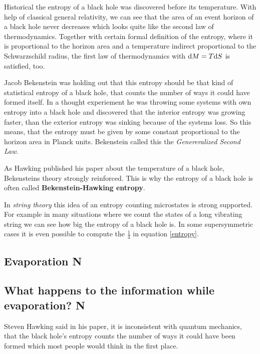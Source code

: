 	Historical the entropy of a black hole was discovered before its temperature. With help of classical general relativity, we can see that the area of an event horizon of a black hole never decreases which looks quite like the second law of thermodynamics. Together with certain formal definition of the entropy, where it is proportional to the horizon area and a temperature indirect proportional to the Schwarzschild radius, the first law of thermodynamics with $\mathrm{d} M = T \mathrm{d} S$ is satisfied, too. 
	
	Jacob Bekenstein was holding out that this entropy should be that kind of statistical entropy of a black hole, that counts the number of ways it could have formed itself. 
	In a thought experiement he was throwing some systems with own entropy into a black hole and discovered that the interior entropy was growing faster, than the exterior entropy was sinking because of the systems loss. 
	So this means, that the entropy must be given by some constant proportional to the horizon area in Planck units.
	Bekenstein called this the \textit{Genereralized Second Law}.
	
	As Hawking published his paper about the temperature of a black hole, Bekensteins theory strongly reinforced. This is why the entropy of a black hole is often called \textbf{Bekenstein-Hawking entropy}. 
	
	In \textit{string theory} this idea of an entropy counting microstates is strong supported. For example in many situations where we count the states of a long vibrating string we can see how big the entropy of a black hole is. In some supersymmetric cases it is even possible to compute the $\frac{1}{4}$ in equation \eqref{entropy}.
	
	\subsection{Evaporation N}

	\subsection{What happens to the information while evaporation? N}
	Steven Hawking said in his paper\marginpar{[2]}, it is inconsistent with quantum mechanics, that the black hole's entropy counts the number of ways it could have been formed which most people would think in the first place. 
	
